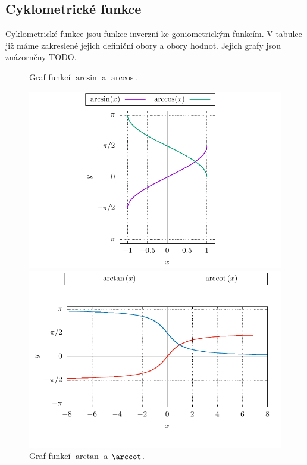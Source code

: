 \subsection{Cyklometrické funkce}

Cyklometrické funkce jsou funkce inverzní ke goniometrickým funkcím. V tabulce již máme zakreslené jejich definiční obory a obory hodnot. Jejich grafy jsou znázorněny TODO.

\begin{figure}[H]
    \centering
    \caption{Graf funkcí $\arcsin$ a $\arccos$.}
    \includegraphics{Gnuplot/Figures/arcsin-arccos.pdf}
    \newline
    \caption{Graf funkcí $\arctan$ a $\arccot$.}
    \includegraphics{Gnuplot/Figures/arctg-arccotg.pdf}
    
\end{figure}
